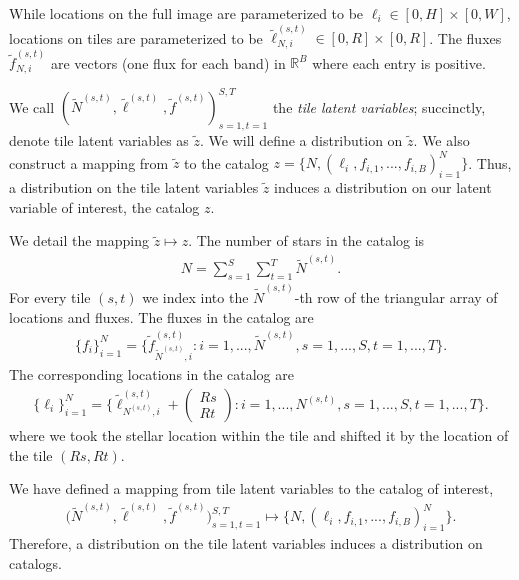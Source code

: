 While locations on the full image are parameterized to be
$\ell_i \in [0, H]\times[0, W]$, locations on tiles are parameterized to be $\tilde\ell_{N, i}^{(s, t)} \in [0, R]\times[0, R]$. The fluxes $\tilde f_{N, i}^{(s, t)}$ are vectors (one flux for each band) in $\mathbb{R}^B$ where each entry is positive. 

We call $(\tilde N^{(s, t)}, \tilde \ell^{(s, t)}, \tilde f^{(s, t)})_{s=1,t=1}^{S,T}$ the {\itshape tile latent variables}; 
succinctly, denote tile latent variables as $\tilde z$. 
We will define a distribution on $\tilde z$. 
We also construct a mapping from $\tilde z$ to 
the catalog $z = \{N, (\ell_i, f_{i,1}, ..., f_{i,B})_{i = 1}^N\}$. Thus, a distribution 
on the tile latent variables $\tilde z$ induces 
a distribution on our latent variable of interest, the catalog $z$. 

We detail the mapping $\tilde z\mapsto z$. 
The number of stars in the catalog is 
\begin{align}
    N = \sum_{s=1}^{S}\sum_{t=1}^T \tilde N^{(s, t)}. 
\end{align}
For every tile $(s,t)$ we index into the $\tilde N^{(s,t)}$-th
row of the triangular array of locations and fluxes. 
The fluxes in the catalog are
\begin{align}
    \{f_i\}_{i=1}^N = \Big\{\tilde f_{\tilde N^{(s, t)}, i}^{(s, t)} : i = 1, ..., \tilde N^{(s, t)}, s = 1, ..., S, t = 1, ..., T \Big\}.
\end{align}
The corresponding locations in the catalog are
\begin{align}
    \{\ell_i\}_{i = 1}^N = \Big\{\tilde \ell_{N^{(s, t)}, i}^{(s, t)} + 
    \begin{pmatrix}
    Rs \\ Rt
    \end{pmatrix} 
    : i = 1, ..., N^{(s, t)}, s = 1, ..., S, t = 1, ..., T\Big\}.
\end{align}
where we took the stellar location within the tile and shifted it by the location of the tile $(Rs, Rt)$. 

We have defined a mapping from tile latent variables to the catalog of interest, 
\begin{align}
 \big(\tilde N^{(s, t)}, \tilde \ell^{(s, t)}, \tilde f^{(s, t)}\big)_{s=1, t = 1}^{S, T}
\mapsto     
\{N, (\ell_i, f_{i,1}, ..., f_{i,B})_{i = 1}^N\}.
\label{eq:patch_to_full_map}
\end{align}
Therefore, a distribution on the tile latent variables induces a distribution on catalogs. 

